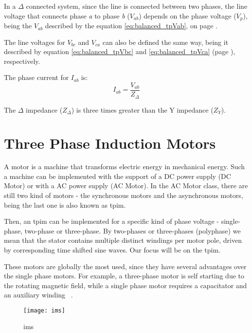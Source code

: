 In a $\Delta$ connected system, since the line is connected between two phases, the line voltage that connects phase \emph{a} to phase \emph{b} ($V_{ab}$) depends on the phase voltage ($V_{p}$), being the $V_{ab}$ described by the equation \ref{eq:balanced_tpVab}, on page \pageref{eq:balanced_tpVab}.

The line voltages for $V_{bc}$ and $V_{ca}$ can also be defined the same way, being it described by equation \ref{eq:balanced_tpVbc} and \ref{eq:balanced_tpVca} (page \pageref{eq:balanced_tpVab}), respectively. 

The phase current for $I_{ab}$ is:
\begin{equation} \label{eq:balanced_tpIab}
	I_{ab} = \frac{V_{ab}}{Z_{\Delta}}
\end{equation}

The $\Delta$ impedance ($Z_{\Delta}$) is three times greater than the Y impedance ($Z_{Y}$).




\section{Three Phase Induction Motors} %
\label{sec:three_phase_induction_motors}

A motor is a machine that transforms electric energy in mechanical energy.
Such a machine can be implemented with the support of a DC power supply (DC Motor) or with a AC power supply (AC Motor).
In the AC Motor class, there are still two kind of motors - the synchronous motors and the asynchronous motors, being the last one is also known as \acrfull{tpim}.


Then, an \acrshort{tpim} can be implemented for a specific kind of phase voltage - single-phase, two-phase or three-phase.
By two-phases or three-phases (polyphase) we mean that the stator contains multiple distinct windings per motor pole, driven by corresponding time shifted sine waves.
Our focus will be on the \acrfull{tpim}.

These motors are  globally the most used, since they have several advantages over the single phase motors. For example, a three-phase motor is self starting due to the rotating magnetic field, while a single phase motor requires a capacitator and an auxiliary winding ~\cite{Ferreira1}.

\begin{figure}[htbp]
	\centering
	\texttt{[image: ims]}
	\caption{\acrfull{ims}}
	\label{fig:ims}
\end{figure}

